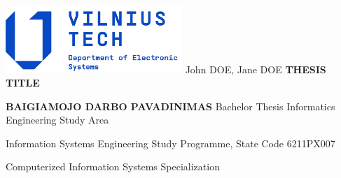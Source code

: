 \begin{titlepage}
    \includegraphics[width=0.5\textwidth]{vtechlogo.png}
    \vskip 7cm
    \noindent\Large John DOE, Jane DOE
    \vskip 1cm
    \noindent\Large \MakeUppercase{\textbf{Thesis title}}

    \noindent\Large \MakeUppercase{\textbf{Baigiamojo darbo pavadinimas}}
    \vskip 1cm
    \noindent\Large Bachelor Thesis
    \vskip 1cm
    \noindent\Large Informatics Engineering Study Area

    \noindent\Large Information Systems Engineering Study Programme, State Code 6211PX007

    \noindent\Large Computerized Information Systems Specialization
\end{titlepage}
\pagebreak
